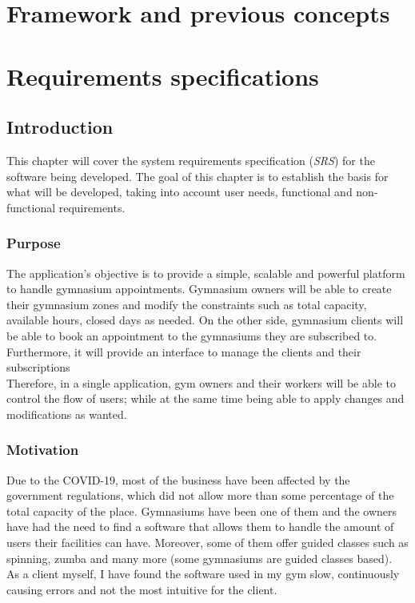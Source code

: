 \documentclass[a4paper, 12pt, oneside]{book}
\begin{document}
\chapter{Framework and previous concepts}
\chapter{Requirements specifications}
\section{Introduction}
This chapter will cover the system requirements specification (\emph{SRS}) for the software being developed. The goal of this chapter is to establish the basis for what will be developed, taking into account user needs, functional and non-functional requirements.
\subsection{Purpose}
The application's objective is to provide a simple, scalable and powerful platform to handle gymnasium appointments. Gymnasium owners will be able to create their gymnasium zones and modify the constraints such as total capacity, available hours, closed days as needed. On the other side, gymnasium clients will be able to book an appointment to the gymnasiums they are subscribed to.  Furthermore, it will provide an interface to manage the clients and their subscriptions
\\[8pt]
Therefore, in a single application, gym owners and their workers will be able to control the flow of users; while at the same time being able to apply changes and modifications as wanted.
\subsection{Motivation}
Due to the COVID-19, most of the business have been affected by the government regulations, which did not allow more than some percentage of the total capacity of the place. Gymnasiums have been one of them and the owners have had the need to find a software that allows them to handle the amount of users their facilities can have. Moreover, some of them offer guided classes such as spinning, zumba and many more (some gymnasiums are guided classes based).
\\[8pt]
As a client myself, I have found the software used in my gym slow, continuously causing errors and not the most intuitive for the client.
\end{document}
